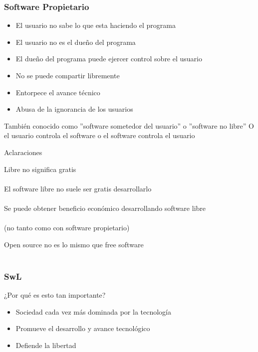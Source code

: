 \documentclass{beamer}
\begin{document}
\begin{frame}\frametitle{Software Propietario}

    \begin{itemize}
        \item El usuario no sabe lo que esta haciendo el programa
        \item El usuario no es el dueño del programa
        \item El dueño del programa puede ejercer control sobre el usuario
        \item No se puede compartir libremente
        \item Entorpece el avance técnico
        \item Abusa de la ignorancia de los usuarios
    \end{itemize}

    También conocido como ''software sometedor del usuario'' o ''software no
    libre''
    O el usuario controla el software o el software controla el usuario

\end{frame}


\begin{frame}{Aclaraciones}
    \begin{center}
        Libre no significa gratis     \\~\\

        El software libre no suele ser gratis desarrollarlo\\~\\

        Se puede obtener beneficio económico desarrollando software libre\\~\\
        (no tanto como con software propietario)

        Open source no es lo mismo que free software\\~\\
    \end{center}
\end{frame}

\begin{frame}\frametitle{SwL}
    \begin{block}{¿Por qué es esto tan importante?}
        \begin{itemize}
                \item Sociedad cada vez más dominada por la tecnología
                \item Promueve el desarrollo y avance tecnológico
                \item Defiende la libertad
        \end{itemize}
    \end{block}
\end{frame}
\end{document}
